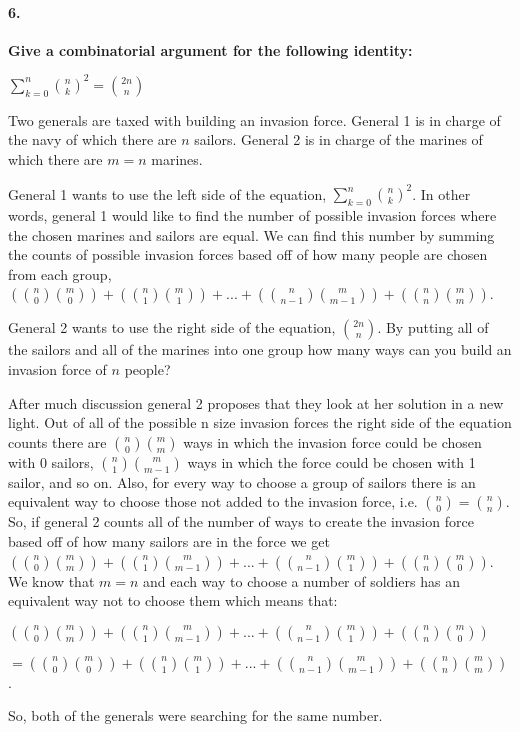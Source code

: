 \documentclass{article}
\begin{document}
\pagebreak

\paragraph{6. }
\textbf{Give a combinatorial argument for the following identity:}
\begin{center}
$\sum\limits_{k=0}^n {n \choose k}^2 = {2n \choose n}$
\end{center}

Two generals are taxed with building an invasion force. General 1 is in charge of the navy of which there are $n$ sailors. General 2 is in charge of the marines of which there are ${m = n}$ marines. 

General 1 wants to use the left side of the equation, ${\sum\limits_{k=0}^n {n \choose k}^2}$. In other words, general 1 would like to find the number of possible invasion forces where the chosen marines and sailors are equal. We can find this number by summing the counts of possible invasion forces based off of how many people are chosen from each group, ${ ({n \choose 0} {m \choose 0}) + ({n \choose 1} {m \choose 1}) + ... + ({n \choose n-1} {m \choose m-1}) + ({n \choose n} {m \choose m})}$.

General 2 wants to use the right side of the equation, ${2n \choose n}$. By putting all of the sailors and all of the marines into one group how many ways can you build an invasion force of $n$ people?

After much discussion general 2 proposes that they look at her solution in a new light. Out of all of the possible n size invasion forces the right side of the equation counts there are ${ {n \choose 0} {m \choose m}}$ ways in which the invasion force could be chosen with 0 sailors, ${ {n \choose 1} {m \choose m-1}}$ ways in which the force could be chosen with 1 sailor, and so on. Also, for every way to choose a group of sailors there is an equivalent way to choose those not added to the invasion force, i.e. ${ {n \choose 0} = {n \choose n}}$. So, if general 2 counts all of the number of ways to create the invasion force based off of how many sailors are in the force we get ${ ({n \choose 0} {m \choose m}) + ({n \choose 1} {m \choose m-1}) + ... + ({n \choose n-1} {m \choose 1}) + ({n \choose n} {m \choose 0})}$. We know that ${m = n}$ and each way to choose a number of soldiers has an equivalent way not to choose them which means that: 

${ ({n \choose 0} {m \choose m}) + ({n \choose 1} {m \choose m-1}) + ... + ({n \choose n-1} {m \choose 1}) + ({n \choose n} {m \choose 0})}$ 

${= ({n \choose 0} {m \choose 0}) + ({n \choose 1} {m \choose 1}) + ... + ({n \choose n-1} {m \choose m-1}) + ({n \choose n} {m \choose m})}$. 

So, both of the generals were searching for the same number.
\end{document}
